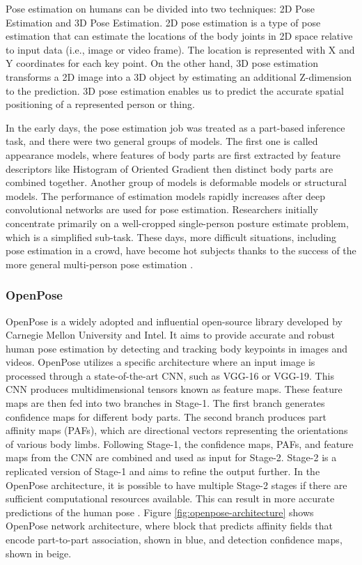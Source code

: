 Pose estimation on humans can be divided into two techniques: 2D Pose Estimation and 3D Pose Estimation.
2D pose estimation is a type of pose estimation that can estimate the locations of the body joints in 2D space relative to input data (i.e., image or video frame). The location is represented with X and Y coordinates for each key point. On the other hand, 3D pose estimation transforms a 2D image into a 3D object by estimating an additional Z-dimension to the prediction. 3D pose estimation enables us to predict the accurate spatial positioning of a represented person or thing.

In the early days, the pose estimation job was treated as a part-based inference task, and there were two general groups of models. The first one is called appearance models, where features of body parts are first extracted by feature descriptors like Histogram of Oriented Gradient then distinct body parts are combined together.
Another group of models is deformable models or structural models. 
The performance of estimation models rapidly increases after deep convolutional networks are used for pose estimation. Researchers initially concentrate primarily on a well-cropped single-person posture estimate problem, which is a simplified sub-task. These days, more difficult situations, including pose estimation in a crowd, have become hot subjects thanks to the success of the more general multi-person pose estimation \parencite{song2021}.

\subsubsection{OpenPose}
\label{subsubsec:openpose}

OpenPose is a widely adopted and influential open-source library developed by Carnegie Mellon University and Intel. It aims to provide accurate and robust human pose estimation by detecting and tracking body keypoints in images and videos.
OpenPose utilizes a specific architecture where an input image is processed through a state-of-the-art CNN, such as VGG-16 or VGG-19. This CNN produces multidimensional tensors known as feature maps. These feature maps are then fed into two branches in Stage-1.
The first branch generates confidence maps for different body parts. The second branch produces part affinity maps (PAFs), which are directional vectors representing the orientations of various body limbs.
Following Stage-1, the confidence maps, PAFs, and feature maps from the CNN are combined and used as input for Stage-2. Stage-2 is a replicated version of Stage-1 and aims to refine the output further. In the OpenPose architecture, it is possible to have multiple Stage-2 stages if there are sufficient computational resources available. This can result in more accurate predictions of the human pose \parencite{cao2019}.
Figure \ref{fig:openpose-architecture} shows OpenPose network architecture, where block that predicts affinity fields that encode part-to-part association, shown in blue, and detection confidence maps, shown in beige.

